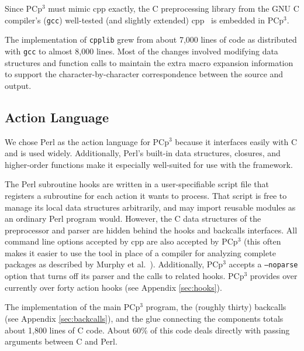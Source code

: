 \documentclass{article}
\newcommand{\pcp}{\mbox{\textsf{PCp}$^3$}}
\newcommand{\Cpp}{\mbox{\textsf{cpp}}}
\newcommand{\Perl}{\mbox{Perl}}
\newcommand{\C}{\mbox{C}}
\begin{document}
Since \pcp{} must mimic \Cpp{} exactly, the \C{}
preprocessing library from the GNU \C{} compiler's (\texttt{gcc})
well-tested (and slightly extended) \Cpp{}~\cite{GCC} is embedded in
\pcp{}.  


The implementation of \texttt{cpplib} grew from about 7,000 lines of
code as distributed with \texttt{gcc} to almost 8,000 lines.  Most of
the changes involved modifying data structures and function calls to
maintain the extra macro expansion information to support the
character-by-character correspondence between the source and output.

\subsection{Action Language}
\label{sec:perl_action_lang}

\nopagebreak

We chose \Perl{} as the action language for \pcp{} because it interfaces
easily with \C{} and is used widely.  Additionally, \Perl{}'s built-in
data structures, closures, and higher-order functions make it especially 
well-suited for use with the framework.

The \Perl{} subroutine hooks are written in a user-specifiable script
file that registers a subroutine for each action it wants to process.
That script is free to manage its local data structures arbitrarily, and
may import reusable modules as an ordinary \Perl{} program would.  However, the
\C{} data structures of the preprocessor and parser are hidden behind
the hooks and backcalls interfaces. All command line options accepted by
\Cpp{} are also accepted by \pcp{} (this often makes it easier to use
the tool in place of a compiler for analyzing complete packages as
described by Murphy et al.~\cite{Murphy98}).  Additionally, \pcp{}
accepts a \texttt{--noparse} option that turns off its parser and the
calls to related hooks.  \pcp{} provides over currently over forty action
hooks (see Appendix \ref{sec:hooks}).

The implementation of the main \pcp{} program, the (roughly thirty)
backcalls (see Appendix \ref{sec:backcalls}),
and the glue connecting the components totals about 1,800
lines of \C{} code.  About 60\% of this code deals directly with passing
arguments between \C{} and \Perl{}.
\end{document}
